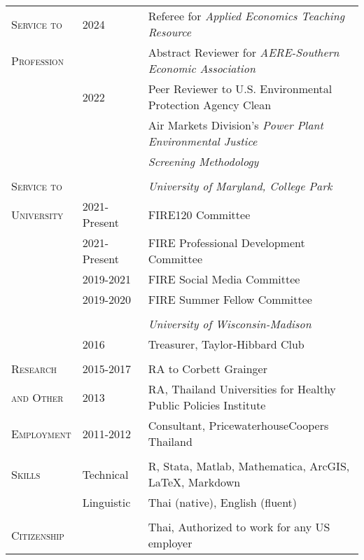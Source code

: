 \documentclass[letterpaper,11pt,oneside]{article}\usepackage[]{graphicx}\usepackage[]{xcolor}
\begin{document}
\begin{tabular}{p{1.2in} p{0.9in} l}
\textsc{Service to}   & 2024          & Referee for \textit{Applied Economics Teaching Resource} \\
\textsc{Profession}   &               & Abstract Reviewer for \textit{AERE-Southern Economic Association} \\
                      & 2022          & Peer Reviewer to U.S. Environmental Protection Agency Clean \\
                      &               & Air Markets Division's \textit{Power Plant Environmental Justice} \\
                  		&               & \textit{Screening Methodology} \href{https://www.epa.gov/system/files/documents/2023-06/PPSM Final Peer Review Report.pdf}{\color{blue}{[LINK]}} \\
                      & & \\
                    
\textsc{Service to}		&               & \textit{University of Maryland, College Park} \\
\textsc{University}	  & 2021-Present  & FIRE120 Committee \\
                      & 2021-Present	& FIRE Professional Development Committee \\
                      & 2019-2021 	  & FIRE Social Media Committee \\
                      & 2019-2020 	  & FIRE Summer Fellow Committee \\
                      & & \\  
                      &               & \textit{University of Wisconsin-Madison} \\
                		  & 2016			    & Treasurer, Taylor-Hibbard Club\\
				              & 				      & \\
                        
\textsc{Research}		& 2015-2017	        & RA to Corbett Grainger\\
\textsc{and Other}	& 2013 				      & RA, Thailand Universities for Healthy Public Policies Institute\\
\textsc{Employment}	& 2011-2012 		    & Consultant, PricewaterhouseCoopers Thailand\\
                    & 				          & \\
\textsc{Skills}	& Technical   & R, Stata, Matlab, Mathematica, ArcGIS, \LaTeX, Markdown \\
        		    & Linguistic & Thai (native), English (fluent) \\
                    & 				          & \\        		    
\textsc{Citizenship} & & Thai, Authorized to work for any US employer	    
\end{tabular}
					
\end{document}
